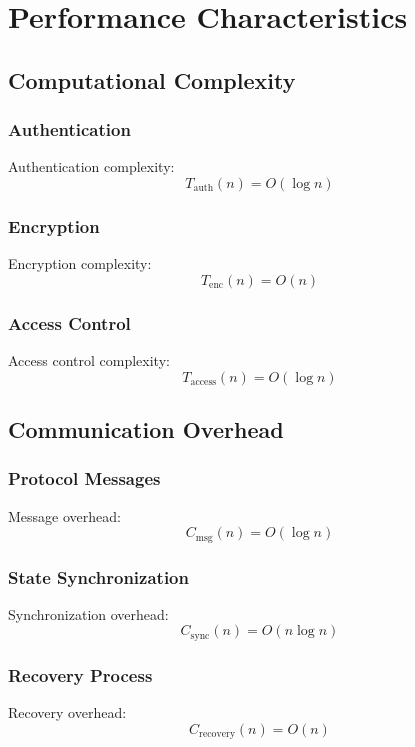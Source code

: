 \documentclass[12pt]{article}
\begin{document}
\section{Performance Characteristics}
\subsection{Computational Complexity}
\subsubsection{Authentication}
Authentication complexity:
\begin{equation}
T_{\text{auth}}(n) = O(\log n)
\end{equation}
\subsubsection{Encryption}
Encryption complexity:
\begin{equation}
T_{\text{enc}}(n) = O(n)
\end{equation}
\subsubsection{Access Control}
Access control complexity:
\begin{equation}
T_{\text{access}}(n) = O(\log n)
\end{equation}
\subsection{Communication Overhead}
\subsubsection{Protocol Messages}
Message overhead:
\begin{equation}
C_{\text{msg}}(n) = O(\log n)
\end{equation}
\subsubsection{State Synchronization}
Synchronization overhead:
\begin{equation}
C_{\text{sync}}(n) = O(n\log n)
\end{equation}
\subsubsection{Recovery Process}
Recovery overhead:
\begin{equation}
C_{\text{recovery}}(n) = O(n)
\end{equation}
\end{document}
